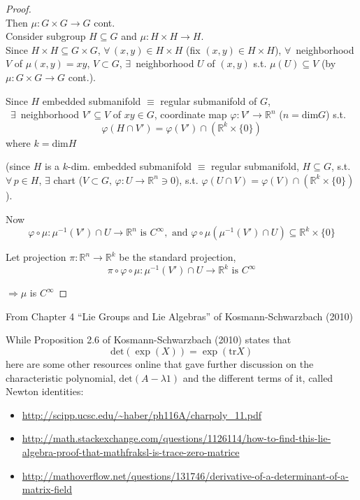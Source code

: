 \documentclass[10pt]{amsart}
\begin{document}
\begin{multicols*}{2}
\begin{proof}
\quad \\ 
Then $\mu : G \times G \to G$ cont.  \\
Consider subgroup $H\subseteq G$ and $\mu : H \times H \to H$. \\
Since $H\times H \subseteq G \times G$, $\forall \, (x,y) \in H \times H$ (fix $(x,y) \in H\times H$), $\forall \, $ neighborhood $V$ of $\mu(x,y) = xy$, $V\subset G$, $\exists \, $ neighborhood $U$ of $(x,y)$ s.t. $\mu(U) \subseteq V$ (by $\mu: G \times G \to G$ cont.).

Since $H$ embedded submanifold $\equiv $ regular submanifold of $G$,  \\
\qquad \, $\exists \, $ neighborhood $V' \subseteq V$ of $xy \in G$, coordinate map $\varphi:V' \to \mathbb{R}^n$ ($n = \text{dim}G$) s.t.
\[
\varphi(H \cap V') = \varphi(V') \cap (\mathbb{R}^k \times \lbrace 0 \rbrace)
\]
where $k = \text{dim}H$	
	
(since $H$ is a $k$-dim. embedded submanifold $\equiv$ regular submanifold, $H\subseteq G$, s.t. $\forall \, p \in H$, $\exists $ chart ($V \subset G, \, \varphi : U \to \mathbb{R}^n \ni 0$), s.t. $\varphi(U \cap V) = \varphi(V) \cap (\mathbb{R}^k \times \lbrace 0 \rbrace)$).

Now \\
\[
\varphi \circ \mu : \mu^{-1}(V') \cap U \to \mathbb{R}^n \text { is } C^{\infty}, \text{ and } \varphi \circ \mu(\mu^{-1}(V') \cap U) \subseteq \mathbb{R}^k \times \lbrace 0 \rbrace 
\]	

Let projection $\pi : \mathbb{R}^n \to \mathbb{R}^k$ be the standard projection, 
\[
\pi \circ \varphi \circ \mu : \mu^{-1}(V') \cap U \to \mathbb{R}^k \text{ is } C^{\infty}
\]
	
$\Longrightarrow \mu $ is $C^{\infty}$	
\end{proof}




From Chapter 4 ``Lie Groups and Lie Algebras'' of Kosmann-Schwarzbach (2010) \cite{YKosmann-Schwarzbach2010}

While Proposition 2.6 of Kosmann-Schwarzbach (2010) \cite{YKosmann-Schwarzbach2010} states that
\[
\text{det}(\exp(X)) = \exp{ (\text{tr}{X} ) }
\]
here are some other resources online that gave further discussion on the characteristic polynomial, $\text{det}(A-\lambda 1)$ and the different terms of it, called Newton identities:
\begin{itemize}
	\item \url{http://scipp.ucsc.edu/~haber/ph116A/charpoly_11.pdf}
	\item \url{http://math.stackexchange.com/questions/1126114/how-to-find-this-lie-algebra-proof-that-mathfraksl-is-trace-zero-matrice}
	\item \url{http://mathoverflow.net/questions/131746/derivative-of-a-determinant-of-a-matrix-field}
\end{itemize}


\end{multicols*}
\end{document}
